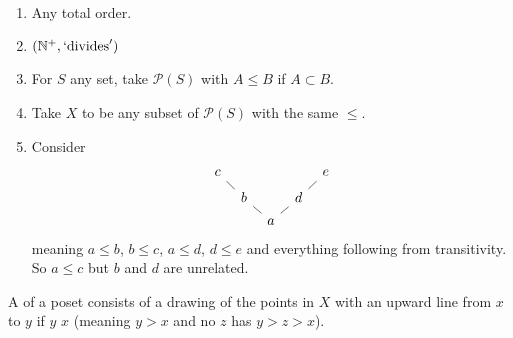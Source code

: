 \documentclass[a4paper, 10pt, twocolumn]{amsart}
\newcommand{\enumpre}{\vspace{-1.5\baselineskip}}
\begin{document}
\begin{example}~
  \enumpre
  \begin{enumerate}
    \item Any total order.
    \item $(\mathbb{N}^+, `\text{divides}')$
    \item For $S$ any set, take $\mathcal{P}(S)$ with $A \leq B$ if $A \subset B$.
    \item Take $X$ to be any subset of $\mathcal{P}(S)$ with the same $\leq$.
    \item Consider
\[\begin{tikzcd}[sep=tiny]
	c &&&& e \\
	& b && d \\
	&& a
	\arrow[no head, from=3-3, to=2-2]
	\arrow[no head, from=2-2, to=1-1]
	\arrow[no head, from=3-3, to=2-4]
	\arrow[no head, from=2-4, to=1-5]
\end{tikzcd}\]
meaning $a \leq b$, $b \leq c$, $a \leq d$, $d \leq e$ and everything following from transitivity. So $a \leq c$ but $b$ and $d$ are unrelated.
  \end{enumerate}
\end{example}

\begin{definition}
  A  of a poset consists of a drawing of the points in $X$ with an upward line from $x$ to $y$ if $y$  $x$ (meaning $y > x$ and no $z$ has $y > z > x$).
\end{definition}
\end{document}
